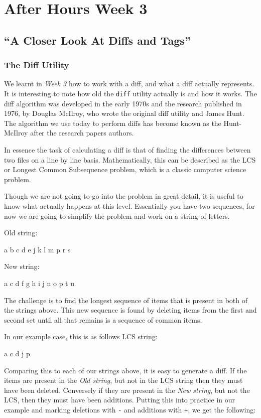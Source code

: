 \chapter{After Hours Week 3}
\section{``A Closer Look At Diffs and Tags''}
\subsection{The Diff Utility}
We learnt in \emph{Week 3} how to work with a diff, and what a diff actually represents.  It is interesting to note how old the \texttt{diff} utility actually is and how it works.  The diff algorithm was developed in the early 1970s and the research published in 1976, by Douglas McIlroy, who wrote the original diff utility and James Hunt.  The algorithm we use today to perform diffs has become known as the Hunt-McIlroy after the research papers authors.

In essence the task of calculating a diff is that of finding the differences between two files on a line by line basis.  Mathematically, this can be described as the LCS or Longest Common Subsequence problem, which is a classic computer science problem.  

Though we are not going to go into the problem in great detail, it is useful to know what actually happens at this level.  Essentially you have two sequences, for now we are going to simplify the problem and work on a string of letters.

Old string: 
\begin{code}
a b c d e j k l m p r s
\end{code}

New string: 
\begin{code}
a c d f g h i j n o p t u
\end{code}

The challenge is to find the longest sequence of items that is present in both of the strings above.  This new sequence is found by deleting items from the first and second set until all that remains is a sequence of common items.  

In our example case, this is as follows
LCS string: 
\begin{code}
a c d j p
\end{code}

Comparing this to each of our strings above, it is easy to generate a diff.  If the items are present in the \emph{Old string}, but not in the LCS string then they must have been deleted.  Conversely if they are present in the \emph{New string}, but not the LCS, then they must have been additions.  Putting this into practice in our example and marking deletions with \texttt{-} and additions with \texttt{+}, we get the following:

